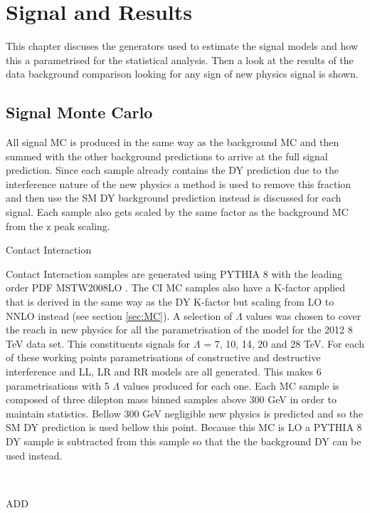 \chapter{Signal and Results}

This chapter discuses the generators used to estimate the signal models and how this a parametrised for the statistical analysis. Then a look at the results of the data background comparison looking for any sign of new physics signal is shown.

\section{Signal Monte Carlo}

	All signal MC is produced in the same way as the background MC and then summed with the other background predictions to arrive at the full signal prediction. Since each sample already contains the DY prediction due to the interference nature of the new physics a method is used to remove this fraction and then use the SM DY background prediction instead is discussed for each signal. Each sample also gets scaled by the same factor as the background MC from the z peak scaling. \\


	{\bf\raggedright Contact Interaction}

	{\raggedright Contact Interaction samples are generated using PYTHIA 8 \cite{} with the leading order PDF MSTW2008LO \cite{}. The CI MC samples also have a K-factor applied that is derived in the same way as the DY K-factor but scaling from LO to NNLO instead (see section \ref{sec:MC}). A selection of $\Lambda$ values was chosen to cover the reach in new physics for all the parametrisation of the model for the 2012 8 TeV data set. This constituents signals for $\Lambda$ = 7, 10, 14, 20 and 28 TeV. For each of these working points parametrisations of constructive and destructive interference and LL, LR and RR models are all generated. This makes 6 parametrisations with 5 $\Lambda$ values produced for each one. Each MC sample is composed of three dilepton mass binned samples above 300 GeV in order to maintain statistics. Bellow 300 GeV negligible new physics is predicted and so the SM DY prediction is used bellow this point. 
	Because this MC is LO a PYTHIA 8 DY sample is subtracted from this sample so that the the background DY can be used instead.} \\


	{\bf\raggedright ADD}

